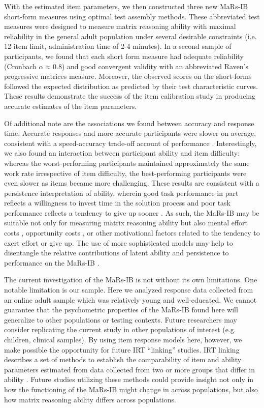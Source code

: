 \documentclass[a4paper,man,natbib]{apa6}
\begin{document}
With the estimated item parameters, we then constructed three new MaRs-IB short-form measures using optimal test assembly methods. These abbreviated test measures were designed to measure matrix reasoning ability with maximal reliability in the general adult population under several desirable constraints (i.e. 12 item limit, administration time of 2-4 minutes). In a second sample of participants, we found that each short form measure had adequate reliability (Cronbach $\alpha \approx 0.8$) and good convergent validity with an abbreviated Raven's progressive matrices measure. Moreover, the observed scores on the short-forms followed the expected distribution as predicted by their test characteristic curves. These results demonstrate the success of the item calibration study in producing accurate estimates of the item parameters. 

Of additional note are the associations we found between accuracy and response time. Accurate responses and more accurate participants were slower on average, consistent with a speed-accuracy trade-off account of performance \citep{heitz2014speed}. Interestingly, we also found an interaction between participant ability and item difficulty: whereas the worst-performing participants maintained approximately the same work rate irrespective of item difficulty, the best-performing participants were even slower as items became more challenging. These results are consistent with a persistence interpretation of ability, wherein good task performance in part reflects a willingness to invest time in the solution process and poor task performance reflects a tendency to give up sooner \citep{ranger2021effects}. As such, the MaRs-IB may be suitable not only for measuring matrix reasoning ability but also mental effort costs \citep{kool2018mental}, opportunity costs \citep{otto2019opportunity}, or other motivational factors \citep{duckworth2011role} related to the tendency to exert effort or give up. The use of more sophisticated models may help to disentangle the relative contributions of latent ability and persistence to performance on the MaRs-IB \citep{ranger2014accumulator}.

The current investigation of the MaRs-IB is not without its own limitations. One notable limitation is our sample. Here we analyzed response data collected from an online adult sample which was relatively young and well-educated. We cannot guarantee that the psychometric properties of the MaRs-IB found here will generalize to other populations or testing contexts. Future researchers may consider replicating the current study in other populations of interest (e.g. children, clinical samples). By using item response models here, however, we make possible the opportunity for future IRT ``linking'' studies. IRT linking describes a set of methods to establish the comparability of item and ability parameters estimated from data collected from two or more groups that differ in ability \citep{lee2018irt}. Future studies utilizing these methods could provide insight not only in how the functioning of the MaRs-IB might change in across populations, but also how matrix reasoning ability differs across populations.
\end{document}
